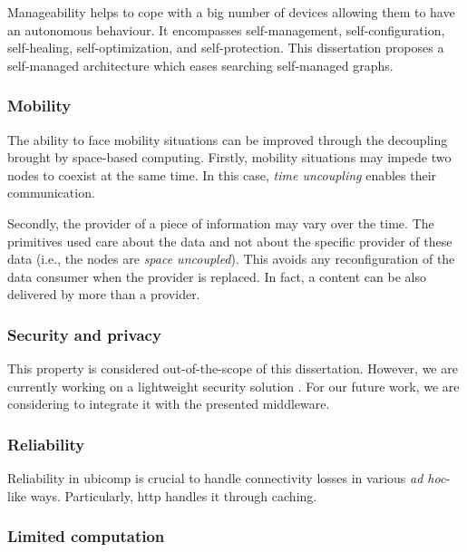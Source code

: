 Manageability helps to cope with a big number of devices allowing them to have an autonomous behaviour. %
It encompasses self-management, self-configuration, self-healing, self-optimization, and self-protection.
This dissertation proposes a self-managed architecture which eases searching self-managed graphs.


\subsubsection{Mobility}

The ability to face mobility situations can be improved through the decoupling brought by space-based computing.
Firstly, mobility situations may impede two nodes to coexist at the same time.
In this case, \emph{time uncoupling} enables their communication.

Secondly, the provider of a piece of information may vary over the time.
The primitives used care about the data and not about the specific provider of these data (i.e., the nodes are \emph{space uncoupled}).
This avoids any reconfiguration of the data consumer when the provider is replaced.
In fact, a content can be also delivered by more than a provider.


\subsubsection{Security and privacy}

This property is considered out-of-the-scope of this dissertation.
However, we are currently working on a lightweight security solution \citep{naranjo_lightweight_2012}. %
For our future work, we are considering to integrate it with the presented middleware.


\subsubsection{Reliability}

Reliability in \ac{ubicomp} is crucial to handle connectivity losses in various \emph{ad hoc}-like ways.
Particularly, \ac{http} handles it through caching.


\subsubsection{Limited computation}

